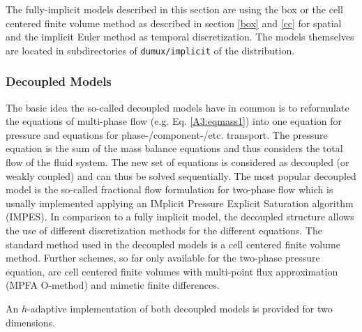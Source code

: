 The fully-implicit models described in this section are using the box or the
cell centered finite volume method as described in section \ref{box} and \ref{cc}
for spatial and the implicit Euler
method as temporal discretization. The models themselves are located in
subdirectories of \texttt{dumux/implicit} of the \Dumux distribution.

\subsubsection{Decoupled Models}
%
The basic idea the so-called decoupled models have in common is to reformulate the
equations of multi-phase flow (e.g. Eq. \ref{A3:eqmass1}) into one equation for
pressure and equations for phase-/component-/etc. transport. The pressure equation
is the sum of the mass balance equations and thus considers the total flow of the
fluid system. The new set of equations is considered as decoupled (or weakly coupled)
and can thus be solved sequentially. The most popular decoupled model is the so-called
fractional flow formulation for two-phase flow which is usually implemented applying
an IMplicit Pressure Explicit Saturation algorithm (IMPES).
In comparison to a fully implicit model, the decoupled structure allows the use of
different discretization methods for the different equations. The standard method
used in the decoupled models is a cell centered finite volume method. Further schemes,
so far only available for the two-phase pressure equation, are cell centered finite
volumes with multi-point flux approximation (MPFA O-method) and mimetic finite differences.

An $h$-adaptive implementation of both decoupled models is provided for two dimensions.
